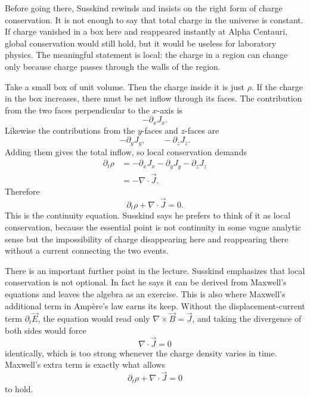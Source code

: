 Before going there, Susskind rewinds and insists on the right form of charge conservation. It is not enough to say that total charge in the universe is constant. If charge vanished in a box here and reappeared instantly at Alpha Centauri, global conservation would still hold, but it would be useless for laboratory physics. The meaningful statement is local: the charge in a region can change only because charge passes through the walls of the region.

Take a small box of unit volume. Then the charge inside it is just $\rho$. If the charge in the box increases, there must be net inflow through its faces. The contribution from the two faces perpendicular to the $x$-axis is
\begin{equation}
-\partial_x J_x.
\end{equation}
Likewise the contributions from the $y$-faces and $z$-faces are
\begin{equation}
-\partial_y J_y,
\qquad
-\partial_z J_z.
\end{equation}
Adding them gives the total inflow, so local conservation demands
\begin{align}
\partial_t\rho
&= -\partial_x J_x-\partial_y J_y-\partial_z J_z \\
&= -\nabla\cdot\vec J.
\end{align}
Therefore
\begin{equation}
\partial_t\rho+\nabla\cdot\vec J=0.
\end{equation}
This is the continuity equation. Susskind says he prefers to think of it as local conservation, because the essential point is not continuity in some vague analytic sense but the impossibility of charge disappearing here and reappearing there without a current connecting the two events.

There is an important further point in the lecture. Susskind emphasizes that local conservation is not optional. In fact he says it can be derived from Maxwell's equations and leaves the algebra as an exercise. This is also where Maxwell's additional term in Amp\`ere's law earns its keep. Without the displacement-current term $\partial_t\vec E$, the equation would read only $\nabla\times\vec B=\vec J$, and taking the divergence of both sides would force
\begin{equation}
\nabla\cdot\vec J=0
\end{equation}
identically, which is too strong whenever the charge density varies in time. Maxwell's extra term is exactly what allows
\begin{equation}
\partial_t\rho+\nabla\cdot\vec J=0
\end{equation}
to hold.

